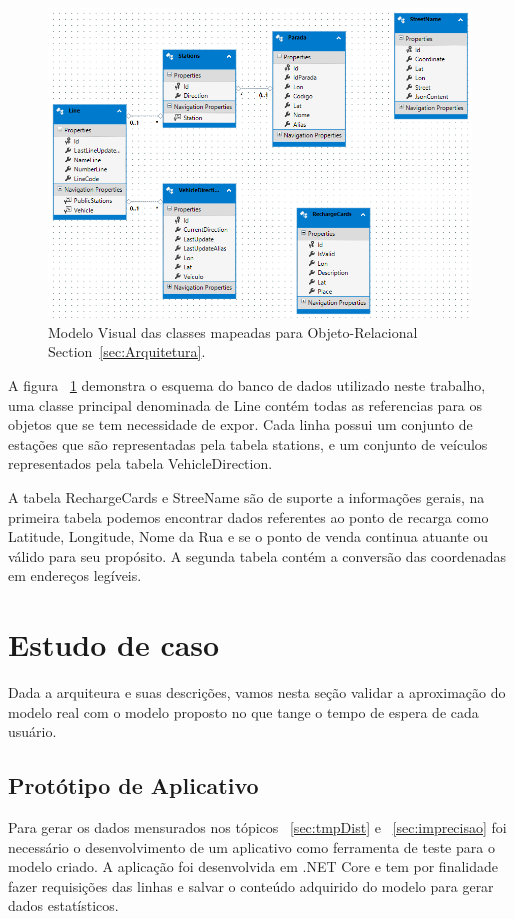 \documentclass[12pt]{article}
\begin{document}
\begin{figure}[h!]
\centering
\includegraphics[width=.99\textwidth]{./Resources/EntityDesignerDiagram.png}
\caption{Modelo Visual das classes mapeadas para Objeto-Relacional Section~\ref{sec:Arquitetura}.}
\label{fig:FiguraEsquemaDatabase}
\end{figure}

A figura ~\ref{fig:FiguraEsquemaDatabase} demonstra o esquema do banco de dados utilizado neste trabalho, uma classe principal denominada de Line contém todas as referencias para os objetos que se tem necessidade de expor. Cada linha possui um conjunto de estações que são representadas pela tabela stations, e um conjunto de veículos representados pela tabela VehicleDirection. 

A tabela RechargeCards e StreeName são de suporte a informações gerais, na primeira tabela podemos encontrar dados referentes ao ponto de recarga como Latitude, Longitude, Nome da Rua e se o ponto de venda continua atuante ou válido para seu propósito. A segunda tabela contém a conversão das coordenadas em endereços legíveis.

\section{Estudo de caso}
Dada a arquiteura e suas descrições, vamos nesta seção validar a aproximação do modelo real com o modelo proposto no que tange o tempo de espera de cada usuário. 

\subsection{Protótipo de Aplicativo}
Para gerar os dados mensurados nos tópicos ~\ref{sec:tmpDist} e  ~\ref{sec:imprecisao} foi necessário o desenvolvimento de um aplicativo como ferramenta de teste para o modelo criado. A aplicação foi desenvolvida em .NET Core e tem por finalidade fazer requisições das linhas e salvar o conteúdo adquirido do modelo para gerar dados estatísticos.
\end{document}
